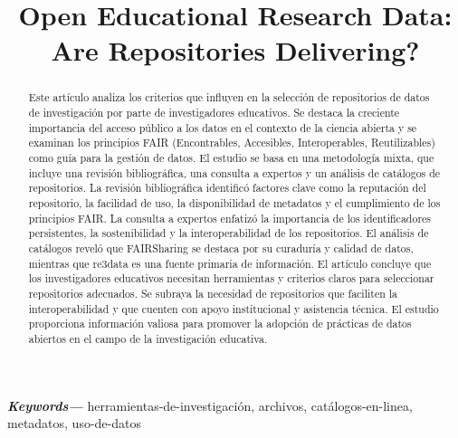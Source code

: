 \documentclass[runningheads]{llncs}
\title{Open Educational Research Data: Are Repositories Delivering?}
\providecommand{\keywords}[1]
{
  \small	
  \textbf{\textit{Keywords---}} #1
}
\begin{document}
\maketitle

\begin{abstract}
Este artículo analiza los criterios que influyen en la selección de repositorios de datos de investigación por parte de investigadores educativos. Se destaca la creciente importancia del acceso público a los datos en el contexto de la ciencia abierta y se examinan los principios FAIR (Encontrables, Accesibles, Interoperables, Reutilizables) como guía para la gestión de datos. El estudio se basa en una metodología mixta, que incluye una revisión bibliográfica, una consulta a expertos y un análisis de catálogos de repositorios.
La revisión bibliográfica identificó factores clave como la reputación del repositorio, la facilidad de uso, la disponibilidad de metadatos y el cumplimiento de los principios FAIR. La consulta a expertos enfatizó la importancia de los identificadores persistentes, la sostenibilidad y la interoperabilidad de los repositorios. El análisis de catálogos reveló que FAIRSharing se destaca por su curaduría y calidad de datos, mientras que re3data es una fuente primaria de información.
El artículo concluye que los investigadores educativos necesitan herramientas y criterios claros para seleccionar repositorios adecuados. Se subraya la necesidad de repositorios que faciliten la interoperabilidad y que cuenten con apoyo institucional y asistencia técnica. El estudio proporciona información valiosa para promover la adopción de prácticas de datos abiertos en el campo de la investigación educativa.
      
\end{abstract}
\keywords{herramientas-de-investigación, archivos, catálogos-en-linea, metadatos, uso-de-datos}
\end{document}
